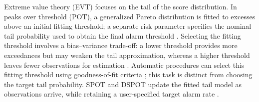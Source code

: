 Extreme value theory (EVT) focuses on the tail of the score distribution. In peaks over threshold (POT), a generalized Pareto distribution is fitted to excesses above an initial fitting threshold; a separate risk parameter specifies the nominal tail probability used to obtain the final alarm threshold \cite{pot_example}. Selecting the fitting threshold involves a bias--variance trade-off: a lower threshold provides more exceedances but may weaken the tail approximation, whereas a higher threshold leaves fewer observations for estimation \cite{scarrott_macdonald_evt_review}. Automatic procedures can select this fitting threshold using goodness-of-fit criteria \cite{automatic_pot_1}; this task is distinct from choosing the target tail probability. SPOT and DSPOT update the fitted tail model as observations arrive, while retaining a user-specified target alarm rate \cite{pot_example}.
